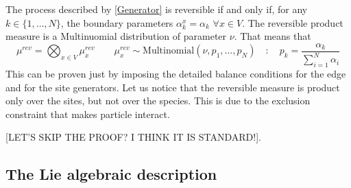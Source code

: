 \documentclass[11pt]{article}
\numberwithin{equation}{subsection}
\newcommand{\twoj}{\nu}
\begin{document}
The process described by \eqref{Generator} is reversible if and only if, for any $k\in\{1,\ldots,N\}$, the boundary parameters $\alpha_{k}^{x}=\alpha_{k}$ $\forall x\in V$. The reversible product measure is a Multinuomial distribution of parameter $\twoj$. That means that 
\begin{equation}\label{reversibleMeasure}
    \mu^{rev}=\bigotimes_{x\in V}\mu^{rev}_{x}\qquad \mu_{x}^{rev}\sim \text{Multinomial}\left(\twoj,p_{1},\ldots,p_{N}\right)\quad :\quad p_{k}=\frac{\alpha_{k}}{\sum_{i=1}^{N}\alpha_{i}}
\end{equation}
This can be proven just by imposing the detailed balance conditions for the edge and for the site generators. Let us notice that the reversible measure is product only over the sites, but not over the species. This is due to the exclusion constraint that makes particle interact. 

{\color{red}[LET'S SKIP THE PROOF? I THINK IT IS STANDARD!]}.\\
\subsection{The Lie algebraic description}



\end{document}
